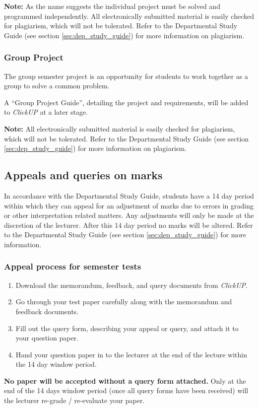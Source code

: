         \textbf{Note:} As the name suggests the individual project must be
        solved and programmed independently. All electronically submitted
        material is easily checked for plagiarism, which will not be tolerated.
        Refer to the Departmental Study Guide (see section
        \ref{sec:dep_study_guide}) for more information on plagiarism.

    \subsubsection{Group Project}
        The group semester project is an opportunity for students to work
        together as a group to solve a common problem.

        A ``Group Project Guide'', detailing the project and requirements,
        will be added to {\it ClickUP} at a later stage.

        \textbf{Note:} All electronically submitted material is easily checked
        for plagiarism, which will not be tolerated. Refer to the Departmental
        Study Guide (see section \ref{sec:dep_study_guide}) for more
        information on plagiarism.

    \subsection{Appeals and queries on marks}
        In accordance with the Departmental Study Guide, students have a 14
        day period within which they can appeal for an adjustment of marks
        due to errors in grading or other interpretation related matters.
        Any adjustments will only be made at the discretion of the lecturer.
        After this 14 day period no marks will be altered. Refer to the
        Departmental Study Guide (see section \ref{sec:dep_study_guide})
        for more information.

        \subsubsection{Appeal process for semester tests}
            \begin{enumerate}
                \item Download the memorandum, feedback, and query documents
                    from {\it ClickUP}.
                \item Go through your test paper carefully along with the
                    memorandum and feedback documents.
                \item Fill out the query form, describing your appeal or query,
                    and attach it to your question paper.
                \item Hand your question paper in to the lecturer at the end of
                    the lecture within the 14 day window period.
            \end{enumerate}

            \textbf{No paper will be accepted without a query form attached.}
            Only at the end of the 14 days window period (once all query forms
            have been received) will the lecturer re-grade / re-evaluate your
            paper.

